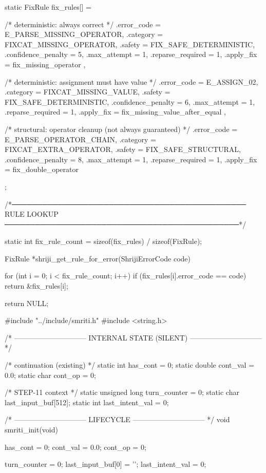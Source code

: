 \documentclass{article}
\begin{document}
static FixRule fix_rules[] = {

    /* deterministic: always correct */
    {
        .error_code = E_PARSE_MISSING_OPERATOR,
        .category = FIXCAT_MISSING_OPERATOR,
        .safety = FIX_SAFE_DETERMINISTIC,
        .confidence_penalty = 5,
        .max_attempt = 1,
        .reparse_required = 1,
        .apply_fix = fix_missing_operator
    },

    /* deterministic: assignment must have value */
    {
        .error_code = E_ASSIGN_02,
        .category = FIXCAT_MISSING_VALUE,
        .safety = FIX_SAFE_DETERMINISTIC,
        .confidence_penalty = 6,
        .max_attempt = 1,
        .reparse_required = 1,
        .apply_fix = fix_missing_value_after_equal
    },

    /* structural: operator cleanup (not always guaranteed) */
    {
        .error_code = E_PARSE_OPERATOR_CHAIN,
        .category = FIXCAT_EXTRA_OPERATOR,
        .safety = FIX_SAFE_STRUCTURAL,
        .confidence_penalty = 8,
        .max_attempt = 1,
        .reparse_required = 1,
        .apply_fix = fix_double_operator
    }

};

/*──────────────────────────────────────────────
    RULE LOOKUP
──────────────────────────────────────────────*/

static int fix_rule_count =
    sizeof(fix_rules) / sizeof(FixRule);

FixRule *shriji_get_rule_for_error(ShrijiErrorCode code)
{
    for (int i = 0; i < fix_rule_count; i++)
    {
        if (fix_rules[i].error_code == code)
            return &fix_rules[i];
    }

    return NULL;
}
#include "../include/smriti.h"
#include <string.h>

/* ------------------------------
   INTERNAL STATE (SILENT)
   ------------------------------ */

/* continuation (existing) */
static int    has_cont = 0;
static double cont_val = 0.0;
static char   cont_op  = 0;

/* STEP-11 context */
static unsigned long turn_counter = 0;
static char last_input_buf[512];
static int  last_intent_val = 0;

/* ------------------------------
   LIFECYCLE
   ------------------------------ */
void smriti_init(void)
{
    has_cont = 0;
    cont_val = 0.0;
    cont_op  = 0;

    turn_counter = 0;
    last_input_buf[0] = '\0';
    last_intent_val = 0;
}
\end{document}
